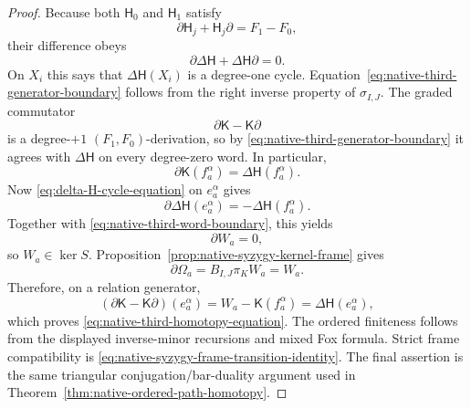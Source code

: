 \documentclass[11pt]{article}
\theoremstyle{definition}
\begin{document}
\begin{proof}
Because both $\mathsf H_0$ and $\mathsf H_1$ satisfy
\[
 \partial\mathsf H_j+\mathsf H_j\partial=F_1-F_0,
\]
their difference obeys
\begin{equation}\label{eq:delta-H-cycle-equation}
 \partial\Delta\mathsf H+\Delta\mathsf H\partial=0.
\end{equation}
On $X_i$ this says that $\Delta\mathsf H(X_i)$ is a degree-one cycle.
Equation~\eqref{eq:native-third-generator-boundary} follows from the right
inverse property of $\sigma_{I,J}$.  The graded commutator
\[
 \partial\mathsf K-\mathsf K\partial
\]
is a degree-$+1$ $(F_1,F_0)$-derivation, so by
\eqref{eq:native-third-generator-boundary} it agrees with
$\Delta\mathsf H$ on every degree-zero word.  In particular,
\begin{equation}\label{eq:native-third-word-boundary}
 \partial\mathsf K(f_a^\alpha)
 =\Delta\mathsf H(f_a^\alpha).
\end{equation}
Now \eqref{eq:delta-H-cycle-equation} on $e_a^\alpha$ gives
\[
 \partial\Delta\mathsf H(e_a^\alpha)
 =-\Delta\mathsf H(f_a^\alpha).
\]
Together with \eqref{eq:native-third-word-boundary}, this yields
\[
 \partial W_a=0,
\]
so $W_a\in\ker S$.  Proposition~\ref{prop:native-syzygy-kernel-frame} gives
\[
 \partial\Omega_a
 =B_{I,J}\pi_KW_a
 =W_a.
\]
Therefore, on a relation generator,
\[
 (\partial\mathsf K-\mathsf K\partial)(e_a^\alpha)
 =W_a-\mathsf K(f_a^\alpha)
 =\Delta\mathsf H(e_a^\alpha),
\]
which proves \eqref{eq:native-third-homotopy-equation}.  The ordered
finiteness follows from the displayed inverse-minor recursions and mixed Fox
formula.  Strict frame compatibility is
\eqref{eq:native-syzygy-frame-transition-identity}.  The final assertion is
the same triangular conjugation/bar-duality argument used in
Theorem~\ref{thm:native-ordered-path-homotopy}.
\end{proof}
\end{document}
